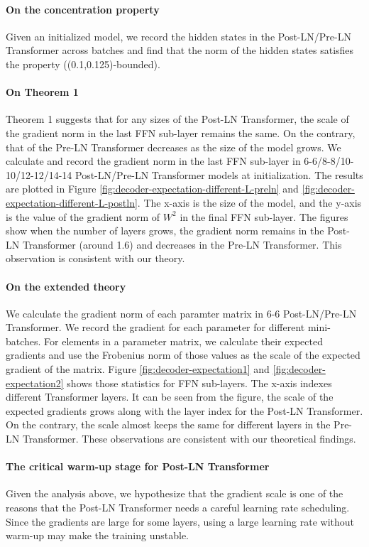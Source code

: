 \documentclass{article}
\begin{document}
\paragraph{On the concentration property} Given an initialized model, we record the hidden states in the Post-LN/Pre-LN Transformer across batches and find that the norm of the hidden states satisfies the property ((0.1,0.125)-bounded).

\paragraph{On Theorem 1} Theorem 1 suggests that for any sizes of the Post-LN Transformer, the scale of the gradient norm in the last FFN sub-layer remains the same. On the contrary, that of the Pre-LN Transformer decreases as the size of the model grows. We calculate and record the gradient norm in the last FFN sub-layer in 6-6/8-8/10-10/12-12/14-14 Post-LN/Pre-LN Transformer models at initialization. The results are plotted in Figure \ref{fig:decoder-expectation-different-L-preln} and \ref{fig:decoder-expectation-different-L-postln}. The x-axis is the size of the model, and the y-axis is the value of the gradient norm of $W^2$ in the final FFN sub-layer. The figures show when the number of layers grows, the gradient norm remains in the Post-LN Transformer (around 1.6) and decreases in the Pre-LN Transformer. This observation is consistent with our theory.

\paragraph{On the extended theory} 
We calculate the gradient norm of each paramter matrix in 6-6 Post-LN/Pre-LN Transformer. We record the gradient for each parameter for different mini-batches. For elements in a parameter matrix, we calculate their expected gradients and use the Frobenius norm of those values as the scale of the expected gradient of the matrix.  Figure \ref{fig:decoder-expectation1} and \ref{fig:decoder-expectation2} shows those statistics for FFN sub-layers. The x-axis indexes different Transformer layers. It can be seen from the figure, the scale of the expected gradients grows along with the layer index for the Post-LN Transformer. On the contrary, the scale almost keeps the same for different layers in the Pre-LN Transformer. These observations are consistent with our theoretical findings.  

\paragraph{The critical warm-up stage for Post-LN Transformer
} Given the analysis above, we hypothesize that the gradient scale is one of the reasons that the Post-LN Transformer needs a careful learning rate scheduling. Since the gradients are large for some layers, using a large learning rate without warm-up may make the training unstable. 
\end{document}
